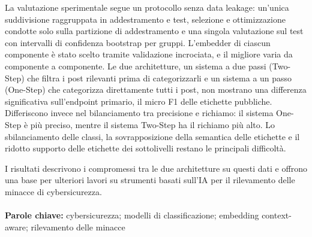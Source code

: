 \documentclass{Configuration_Files/PoliMi3i_thesis}
\begin{document}
La valutazione sperimentale segue un protocollo senza data leakage: un'unica suddivisione raggruppata in addestramento e test, selezione e ottimizzazione condotte solo sulla partizione di addestramento e una singola valutazione sul test con intervalli di confidenza bootstrap per gruppi. L'embedder di ciascun componente è stato scelto tramite validazione incrociata, e il migliore varia da componente a componente. Le due architetture, un sistema a due passi (Two-Step) che filtra i post rilevanti prima di categorizzarli e un sistema a un passo (One-Step) che categorizza direttamente tutti i post, non mostrano una differenza significativa sull'endpoint primario, il micro F1 delle etichette pubbliche. Differiscono invece nel bilanciamento tra precisione e richiamo: il sistema One-Step è più preciso, mentre il sistema Two-Step ha il richiamo più alto. Lo sbilanciamento delle classi, la sovrapposizione della semantica delle etichette e il ridotto supporto delle etichette dei sottolivelli restano le principali difficoltà.

I risultati descrivono i compromessi tra le due architetture su questi dati e offrono una base per ulteriori lavori su strumenti basati sull'IA per il rilevamento delle minacce di cybersicurezza.
\\
\\
\textbf{Parole chiave:} cybersicurezza; modelli di classificazione; embedding context-aware; rilevamento delle minacce %


\thispagestyle{empty}
\tableofcontents %
\thispagestyle{empty}
\cleardoublepage

%
%
%    
%
\end{document}
